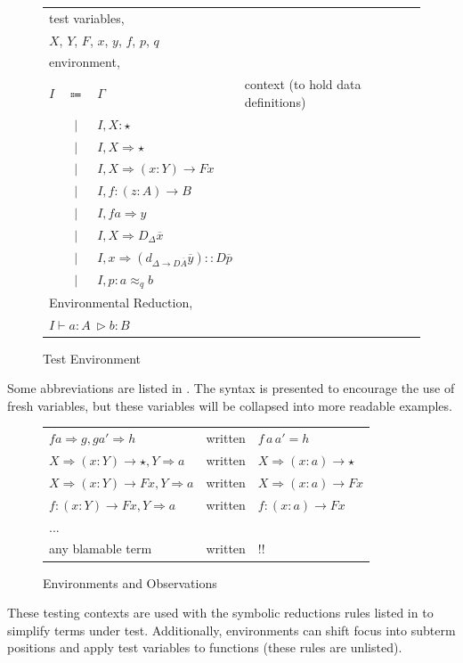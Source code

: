 \begin{figure}
\begin{tabular}{lcll}
\multicolumn{4}{l}{test variables,}\tabularnewline
\multicolumn{4}{l}{$X$, $Y$, $F$, $x$, $y$, $f$, $p$, $q$}\tabularnewline
\multicolumn{4}{l}{environment,}\tabularnewline
$I$ & $\Coloneqq$ & $\varGamma$ & context (to hold data definitions)\tabularnewline
  & $|$ & $I,X:\star$ & \tabularnewline
  & $|$ & $I,X\Rightarrow\star$ & \tabularnewline
  & $|$ & $I,X\Rightarrow\left(x:Y\right)\rightarrow Fx$ & \tabularnewline
  & $|$ & $I,f:\left(z:A\right)\rightarrow B$ & \tabularnewline
  & $|$ & $I,fa\Rightarrow y$ & \tabularnewline
  & $|$ & $I,X\Rightarrow D_{\Delta}\overline{x}$ & \tabularnewline
  & $|$ & $I,x\Rightarrow\left(d_{\Delta\rightarrow D\overline{A}}\overline{y}\right)::D\overline{p}$ & \tabularnewline
  & $|$ & $I,p:a\approx_{q}b$ & \tabularnewline
\multicolumn{4}{l}{Environmental Reduction,}\tabularnewline
\multicolumn{4}{l}{$I\vdash  a:A\ \vartriangleright b:B$}\tabularnewline
\end{tabular}

\caption{Test Environment}
\label{fig:sym-env-obs}
\end{figure}

Some abbreviations are listed in .
The syntax is presented to encourage the use of fresh variables, but these variables will be collapsed into more readable examples.

\begin{figure}
  \begin{tabular}{lcl}
  $fa\Rightarrow g,ga'\Rightarrow h$ & written & $f\,a\,a'=h$\tabularnewline
  $X\Rightarrow\left(x:Y\right)\rightarrow\star,Y\Rightarrow a$ & written & $X\Rightarrow\left(x:a\right)\rightarrow\star$\tabularnewline
  $X\Rightarrow\left(x:Y\right)\rightarrow Fx,Y\Rightarrow a$ & written & $X\Rightarrow\left(x:a\right)\rightarrow Fx$\tabularnewline
  $f:\left(x:Y\right)\rightarrow Fx,Y\Rightarrow a$ & written & $f:\left(x:a\right)\rightarrow Fx$\tabularnewline
  ... &  & \tabularnewline
  any blamable term & written & !!\tabularnewline
  \end{tabular}\caption{Environments and Observations}
  \label{fig:sym-env-obs-abbiv}
  \end{figure}

  

These testing contexts are used with the symbolic reductions rules listed in  to simplify terms under test.
Additionally, environments can shift focus into subterm positions and apply test variables to functions (these rules are unlisted).

